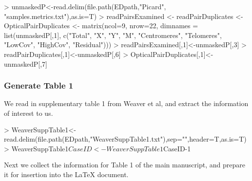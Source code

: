 \documentclass{article}
\begin{document}
\begin{Schunk}
\begin{Sinput}
> unmaskedP<-read.delim(file.path(EDpath,"Picard", "samples.metrics.txt"),as.is=T)
> readPairsExamined <- readPairDuplicates <- OpticalPairDuplicates <- matrix(ncol=9, nrow=22, dimnames = list(unmaskedP[,1], c("Total", "X", "Y", "M", "Centromeres", "Telomeres", "LowCov", "HighCov", "Residual")))
> readPairsExamined[,1]<-unmaskedP[,3]
> readPairDuplicates[,1]<-unmaskedP[,6]
> OpticalPairDuplicates[,1]<-unmaskedP[,7]
\end{Sinput}
\end{Schunk}


\subsubsection{Generate Table 1}

We read in supplementary table 1 from Weaver et al, and extract the information of interest to us.

\begin{Schunk}
\begin{Sinput}
> WeaverSuppTable1<-read.delim(file.path(EDpath,"WeaverSuppTable1.txt"),sep="",header=T,as.is=T)
> WeaverSuppTable1$CaseID<-WeaverSuppTable1$CaseID-1
\end{Sinput}
\end{Schunk}

Next we collect the information for Table 1 of the main manuscript, and prepare it for insertion into the LaTeX document.
\end{document}
